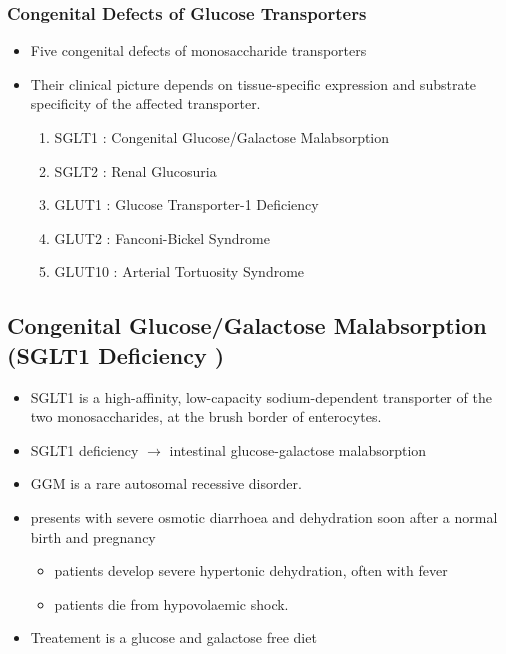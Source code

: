 \documentclass{scrartcl}
\begin{document}
\subsubsection{Congenital Defects of Glucose Transporters}
\label{sec:org884b3aa}
\begin{itemize}
\item Five congenital defects of monosaccharide transporters
\item Their clinical picture depends on tissue-specific expression and
substrate specificity of the affected transporter.

\begin{enumerate}
\item SGLT1 : Congenital Glucose/Galactose Malabsorption
\item SGLT2 : Renal Glucosuria
\item GLUT1 : Glucose Transporter-1 Deficiency
\item GLUT2 : Fanconi-Bickel Syndrome
\item GLUT10 : Arterial Tortuosity Syndrome
\end{enumerate}
\end{itemize}

\subsection{Congenital Glucose/Galactose Malabsorption (SGLT1 Deficiency )}
\label{sec:org73ef118}

\begin{itemize}
\item SGLT1 is a high-affinity, low-capacity sodium-dependent transporter
of the two monosaccharides, at the brush border of enterocytes.

\item SGLT1 deficiency \(\to\) intestinal glucose-galactose malabsorption
\item GGM is a rare autosomal recessive disorder.

\item presents with severe osmotic diarrhoea and dehydration soon after a
normal birth and pregnancy
\begin{itemize}
\item patients develop severe hypertonic dehydration, often with fever
\item patients die from hypovolaemic shock.
\end{itemize}

\item Treatement is a glucose and galactose free diet
\end{itemize}
\end{document}
